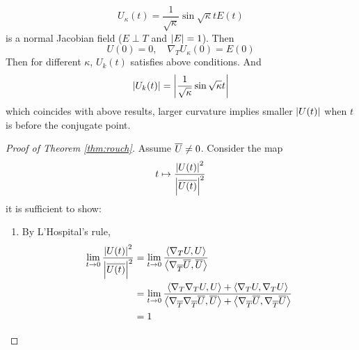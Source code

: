 \begin{enumerate}[label=\arabic{*}.]
\begin{exam}
		\begin{equation*}
			U_\kappa(t) = \frac{1}{\sqrt{\kappa}}\sin\sqrt{\kappa}t E(t)
		\end{equation*}
		is a normal Jacobian field ($E \perp T$ and $\left\lvert E\right\lvert = 1$). Then
		\begin{equation*}
			U(0) = 0,\quad \nabla_TU_\kappa(0) = E(0)
		\end{equation*}
		Then for different $\kappa$, $U_k(t)$ satisfies above conditions. And
		\begin{equation*}
			\left\lvert U_k(t)\right\lvert = \left\lvert\frac{1}{\sqrt{\kappa}}\sin\sqrt{\kappa}t\right\lvert
		\end{equation*}
		which coincides with above results, larger curvature implies smaller $\left\lvert U(t)\right\lvert$ when $t$ is before the conjugate point.
	\end{exam}
	\begin{proof}[Proof of Theorem \ref{thm:rouch}]
		Assume $\overline{U} \neq 0$. Consider the map
		\begin{equation*}
			t \mapsto \frac{\left\lvert U(t)\right\lvert^2}{\left\lvert\overline{U(t)}\right\lvert^2}
		\end{equation*}
		it is sufficient to show:
		\begin{enumerate}[label=\Roman*.]
			\item By L'Hospital's rule,
			\begin{equation*}
				\begin{aligned}
				 	\lim_{t \rightarrow 0}\frac{\left\lvert U(t)\right\lvert^2}{\left\lvert\overline{U(t)}\right\lvert^2} &= \lim_{t \rightarrow 0}\frac{\left\langle \nabla_TU,U \right\rangle}{\left\langle \nabla_{\overline{T}}\overline{U},\overline{U} \right\rangle} \\
				 	&= \lim_{t \rightarrow 0}\frac{\left\langle \nabla_T\nabla_TU,U \right\rangle + \left\langle \nabla_TU,\nabla_TU \right\rangle}{\left\langle \nabla_{\overline{T}}\nabla_{\overline{T}}\overline{U},\overline{U} \right\rangle+ \left\langle \nabla_{\overline{T}}\overline{U},\nabla_{\overline{T}}\overline{U} \right\rangle} \\
				 	&= 1
				 \end{aligned} 
			\end{equation*}


\end{enumerate}
\end{proof}
\end{enumerate}

